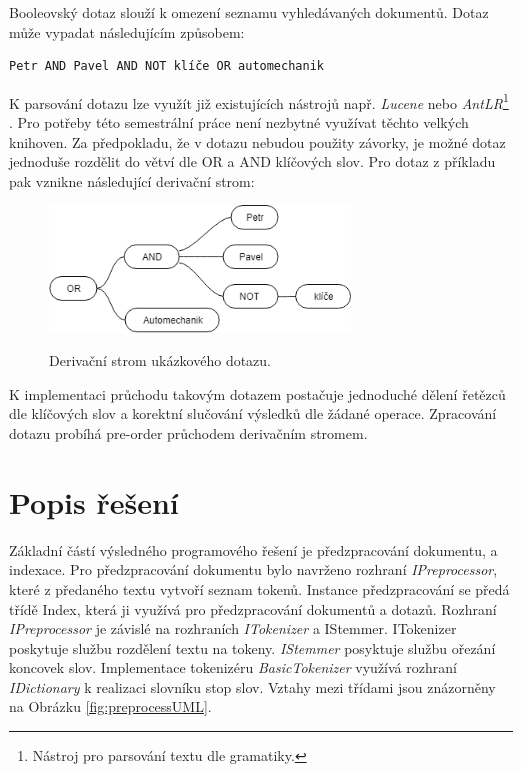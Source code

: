 \documentclass[12pt, a4paper]{article}
\begin{document}
Booleovský dotaz slouží k omezení seznamu vyhledávaných dokumentů. Dotaz může vypadat následujícím způsobem:
\begin{verbatim}
Petr AND Pavel AND NOT klíče OR automechanik
\end{verbatim} 
K parsování dotazu lze využít již existujících nástrojů např. \emph{Lucene} nebo \emph{AntLR}\footnote{Nástroj pro parsování textu dle gramatiky.} . Pro potřeby této semestrální práce není nezbytné využívat těchto velkých knihoven. Za předpokladu, že v dotazu nebudou použity závorky, je možné dotaz jednoduše rozdělit do větví dle OR a AND klíčových slov. Pro dotaz z příkladu pak vznikne následující derivační strom:

\begin{figure}[h!]
\centering
\includegraphics[bb= 0 0 385 162 , width=80mm]{boolean.png}
\label{fig:boolean}
\caption{Derivační strom ukázkového dotazu.}
\end{figure}

K implementaci průchodu takovým dotazem postačuje jednoduché dělení řetězců dle klíčových slov a korektní slučování výsledků dle žádané operace. Zpracování dotazu probíhá pre-order průchodem derivačním stromem.

\newpage
\section{Popis řešení}

Základní částí výsledného programového řešení je předzpracování dokumentu, a indexace. Pro předzpracování dokumentu bylo navrženo rozhraní \emph{IPreprocessor}, které z předaného textu vytvoří seznam tokenů. Instance předzpracování se předá třídě Index, která ji využívá pro předzpracování dokumentů a dotazů. Rozhraní \emph{IPreprocessor} je závislé na rozhraních \emph{ITokenizer} a IStemmer. ITokenizer poskytuje službu rozdělení textu na tokeny. \emph{IStemmer} posyktuje službu ořezání koncovek slov. Implementace tokenizéru \emph{BasicTokenizer} využívá rozhraní \emph{IDictionary} k realizaci slovníku stop slov. Vztahy mezi třídami jsou znázorněny na Obrázku \ref{fig:preprocessUML}.
\end{document}
